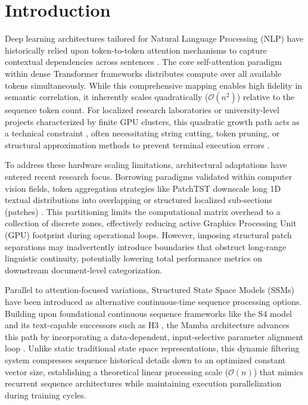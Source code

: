 \documentclass[runningheads]{llncs}
\begin{document}
\section{Introduction}
Deep learning architectures tailored for Natural Language Processing (NLP) have historically relied upon token-to-token attention mechanisms to capture contextual dependencies across sentences \cite{vaswani,minaee,bert}. The core self-attention paradigm within dense Transformer frameworks distributes compute over all available tokens simultaneously. While this comprehensive mapping enables high fidelity in semantic correlation, it inherently scales quadratically ($\mathcal{O}(n^2)$) relative to the sequence token count. For localized research laboratories or university-level projects characterized by finite GPU clusters, this quadratic growth path acts as a technical constraint \cite{lora}, often necessitating string cutting, token pruning, or structural approximation methods to prevent terminal execution errors \cite{efficient_transformers}.

To address these hardware scaling limitations, architectural adaptations have entered recent research focus. Borrowing paradigms validated within computer vision fields, token aggregation strategies like PatchTST downscale long 1D textual distributions into overlapping or structured localized sub-sections (patches) \cite{patchtst}. This partitioning limits the computational matrix overhead to a collection of discrete zones, effectively reducing active Graphics Processing Unit (GPU) footprint during operational loops. However, imposing structural patch separations may inadvertently introduce boundaries that obstruct long-range linguistic continuity, potentially lowering total performance metrics on downstream document-level categorization.

Parallel to attention-focused variations, Structured State Space Models (SSMs) have been introduced as alternative continuous-time sequence processing options. Building upon foundational continuous sequence frameworks like the S4 model \cite{s4} and its text-capable successors such as H3 \cite{h3}, the Mamba architecture advances this path by incorporating a data-dependent, input-selective parameter alignment loop \cite{mamba}. Unlike static traditional state space representations, this dynamic filtering system compresses sequence historical details down to an optimized constant vector size, establishing a theoretical linear processing scale ($\mathcal{O}(n)$) that mimics recurrent sequence architectures while maintaining execution parallelization during training cycles.
\end{document}
